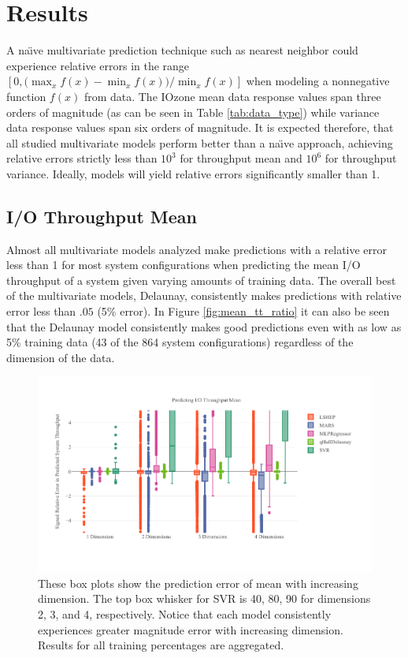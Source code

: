 \documentclass{scspaperproc}
\theoremstyle{scsthe}
\begin{document}
\section{Results}
\label{sec:results}

A na\"{\i}ve multivariate prediction technique such as nearest
neighbor could experience relative errors in the range $\displaystyle
[0, \big(\max_x f(x) - \min_x f(x)\big) / \min_x f(x) ]$ when modeling
a nonnegative function $f(x)$ from data. The IOzone mean data response
values span three orders of magnitude (as can be seen in Table
\ref{tab:data_type}) while variance data response values span six
orders of magnitude. It is expected therefore, that all studied
multivariate models perform better than a na\"{\i}ve approach,
achieving relative errors strictly less than $10^3$ for throughput
mean and $10^6$ for throughput variance. Ideally, models will
yield relative errors significantly smaller than 1.

\vspace{-10pt}
\subsection{I/O Throughput Mean}
\vspace{-10pt}
Almost all multivariate models analyzed make predictions with a
relative error less than 1 for most system configurations when
predicting the mean I/O throughput of a system given varying amounts
of training data. The overall best of the multivariate models,
Delaunay, consistently makes predictions with relative error less than
$.05$ (5\% error). In Figure \ref{fig:mean_tt_ratio} it can also be
seen that the Delaunay model consistently makes good predictions even
with as low as 5\% training data (43 of the 864 system configurations)
regardless of the dimension of the data.

\begin{figure}
  \centering
  \includegraphics[width=\textwidth,trim={0 .5in 0 .3in}]{Mean_Dim.pdf}
  \caption{These box plots show the prediction error of mean with
    increasing dimension. The top box whisker for SVR is 40, 80, 90
    for dimensions 2, 3, and 4, respectively. Notice that each model
    consistently experiences greater magnitude error with increasing
    dimension. Results for all training percentages are aggregated.}
  \label{fig:mean_dim}
\end{figure}
\end{document}
